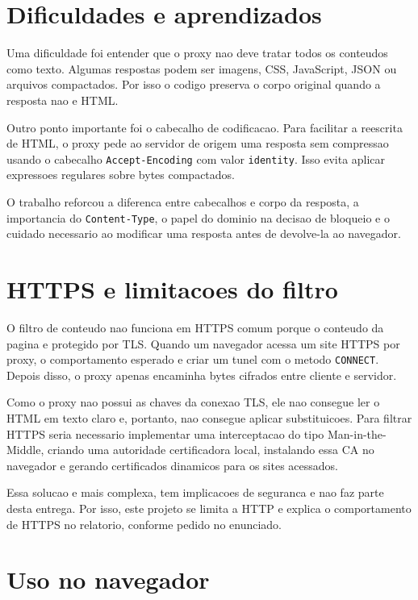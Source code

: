 \documentclass[12pt,a4paper]{article}
\begin{document}
\section{Dificuldades e aprendizados}

Uma dificuldade foi entender que o proxy nao deve tratar todos os conteudos como texto. Algumas respostas podem ser imagens, CSS, JavaScript, JSON ou arquivos compactados. Por isso o codigo preserva o corpo original quando a resposta nao e HTML.

Outro ponto importante foi o cabecalho de codificacao. Para facilitar a reescrita de HTML, o proxy pede ao servidor de origem uma resposta sem compressao usando o cabecalho \texttt{Accept-Encoding} com valor \texttt{identity}. Isso evita aplicar expressoes regulares sobre bytes compactados.

O trabalho reforcou a diferenca entre cabecalhos e corpo da resposta, a importancia do \texttt{Content-Type}, o papel do dominio na decisao de bloqueio e o cuidado necessario ao modificar uma resposta antes de devolve-la ao navegador.

\section{HTTPS e limitacoes do filtro}

O filtro de conteudo nao funciona em HTTPS comum porque o conteudo da pagina e protegido por TLS. Quando um navegador acessa um site HTTPS por proxy, o comportamento esperado e criar um tunel com o metodo \texttt{CONNECT}. Depois disso, o proxy apenas encaminha bytes cifrados entre cliente e servidor.

Como o proxy nao possui as chaves da conexao TLS, ele nao consegue ler o HTML em texto claro e, portanto, nao consegue aplicar substituicoes. Para filtrar HTTPS seria necessario implementar uma interceptacao do tipo Man-in-the-Middle, criando uma autoridade certificadora local, instalando essa CA no navegador e gerando certificados dinamicos para os sites acessados.

Essa solucao e mais complexa, tem implicacoes de seguranca e nao faz parte desta entrega. Por isso, este projeto se limita a HTTP e explica o comportamento de HTTPS no relatorio, conforme pedido no enunciado.

\section{Uso no navegador}
\end{document}

